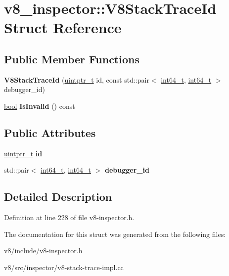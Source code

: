 \hypertarget{structv8__inspector_1_1V8StackTraceId}{}\section{v8\+\_\+inspector\+:\+:V8\+Stack\+Trace\+Id Struct Reference}
\label{structv8__inspector_1_1V8StackTraceId}
\subsection*{Public Member Functions}
\begin{DoxyCompactItemize}
\item 
\mbox{\label{structv8__inspector_1_1V8StackTraceId_a229d85e0a584d86a881b6ef575b1a9a2}} 
{\bfseries V8\+Stack\+Trace\+Id} (\mbox{\hyperlink{classuintptr__t}{uintptr\+\_\+t}} id, const std\+::pair$<$ \mbox{\hyperlink{classint64__t}{int64\+\_\+t}}, \mbox{\hyperlink{classint64__t}{int64\+\_\+t}} $>$ debugger\+\_\+id)
\item 
\mbox{\label{structv8__inspector_1_1V8StackTraceId_a20fd4c6fe649f6663b7855f38681a211}} 
\mbox{\hyperlink{classbool}{bool}} {\bfseries Is\+Invalid} () const
\end{DoxyCompactItemize}
\subsection*{Public Attributes}
\begin{DoxyCompactItemize}
\item 
\mbox{\label{structv8__inspector_1_1V8StackTraceId_ad9e65194b2f95f1a9b98fdc76af8dae2}} 
\mbox{\hyperlink{classuintptr__t}{uintptr\+\_\+t}} {\bfseries id}
\item 
\mbox{\label{structv8__inspector_1_1V8StackTraceId_aa64ad33eb9a49a373f87aaa5e0964500}} 
std\+::pair$<$ \mbox{\hyperlink{classint64__t}{int64\+\_\+t}}, \mbox{\hyperlink{classint64__t}{int64\+\_\+t}} $>$ {\bfseries debugger\+\_\+id}
\end{DoxyCompactItemize}


\subsection{Detailed Description}


Definition at line 228 of file v8-\/inspector.\+h.



The documentation for this struct was generated from the following files\+:\begin{DoxyCompactItemize}
\item 
v8/include/v8-\/inspector.\+h\item 
v8/src/inspector/v8-\/stack-\/trace-\/impl.\+cc\end{DoxyCompactItemize}
